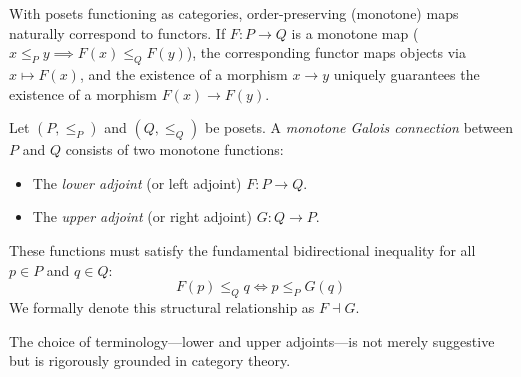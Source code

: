 With posets functioning as categories, order-preserving (monotone) maps naturally correspond to functors. If $F: P \to Q$ is a monotone map ($x \leq_P y \implies F(x) \leq_Q F(y)$), the corresponding functor maps objects via $x \mapsto F(x)$, and the existence of a morphism $x \to y$ uniquely guarantees the existence of a morphism $F(x) \to F(y)$. 

\begin{definition}
\label{def:monotone_galois}
Let $(P, \leq_P)$ and $(Q, \leq_Q)$ be posets. A \emph{monotone Galois connection} between $P$ and $Q$ consists of two monotone functions:
\begin{itemize}
    \item The \emph{lower adjoint} (or left adjoint) $F: P \to Q$.
    \item The \emph{upper adjoint} (or right adjoint) $G: Q \to P$.
\end{itemize}
These functions must satisfy the fundamental bidirectional inequality for all $p \in P$ and $q \in Q$:
\begin{equation}
\label{eq:galois_condition}
    F(p) \leq_Q q \iff p \leq_P G(q)
\end{equation}
We formally denote this structural relationship as $F \dashv G$.
\end{definition}

The choice of terminology---lower and upper adjoints---is not merely suggestive but is rigorously grounded in category theory. 

